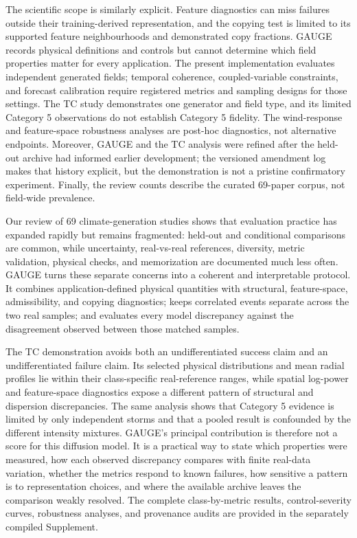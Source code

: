 \documentclass[gmd, manuscript]{copernicus}
\begin{document}
The scientific scope is similarly explicit. Feature diagnostics can miss failures
outside their training-derived representation, and the copying test is limited to its
supported feature neighbourhoods and demonstrated copy fractions. GAUGE records
physical definitions and controls but cannot determine which field properties matter
for every application.
The present implementation evaluates independent generated fields; temporal
coherence, coupled-variable constraints, and forecast calibration require registered
metrics and sampling designs for those settings. The TC study demonstrates one
generator and field type, and its limited Category 5 observations do not establish
Category 5 fidelity. The wind-response and feature-space robustness analyses are
post-hoc diagnostics, not alternative endpoints. Moreover, GAUGE and the TC analysis
were refined after the held-out archive had informed earlier development; the
versioned amendment log makes that history explicit, but the demonstration is not a
pristine confirmatory experiment. Finally, the review counts describe the curated
69-paper corpus, not field-wide prevalence.

\conclusions

Our review of 69 climate-generation studies shows that evaluation practice has
expanded rapidly but remains fragmented: held-out and conditional comparisons are
common, while uncertainty, real-vs-real references, diversity, metric validation,
physical checks, and memorization are documented much less often. GAUGE turns
these separate concerns into a coherent and interpretable protocol. It combines
application-defined physical quantities with structural, feature-space,
admissibility, and copying diagnostics; keeps correlated events separate across the
two real samples; and evaluates every model discrepancy against the disagreement
observed between those matched samples.

The TC demonstration avoids both an undifferentiated success claim and an
undifferentiated failure claim. Its selected physical distributions and mean radial
profiles lie within their class-specific real-reference ranges, while spatial
log-power and feature-space diagnostics expose a different pattern of structural and
dispersion discrepancies. The same analysis shows that Category 5 evidence is limited
by only \CfiveStorms{} independent storms and that a pooled result is confounded by
the different intensity mixtures.
GAUGE's principal contribution is therefore not a score for this diffusion model. It
is a practical way to state which properties were measured, how each observed
discrepancy compares with finite real-data variation, whether the metrics respond to
known failures, how sensitive a pattern is to representation choices, and where the
available archive leaves the comparison weakly resolved. The
complete class-by-metric results, control-severity curves, robustness analyses, and
provenance audits are provided in the separately compiled Supplement.
\end{document}
